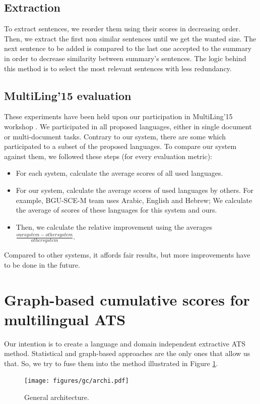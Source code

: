 \documentclass[12pt, oneside, a4paper]{article}
\begin{document}
\subsection{Extraction}

To extract sentences, we reorder them using their scores in decreasing order.
Then, we extract the first non similar sentences until we get the wanted size.
The next sentence to be added is compared to the last one accepted to the summary in order to decrease similarity between summary's sentences.
The logic behind this method is to select the most relevant sentences with less redundancy.

\subsection{MultiLing'15 evaluation}

These experiments have been held upon our participation in MultiLing'15 workshop \citep{15-aries-al}. 
We participated in all proposed languages, either in single document or multi-document tasks.
Contrary to our system, there are some which participated to a subset of the proposed languages. 
To compare our system against them, we followed these steps (for every evaluation metric): 
\begin{itemize}
	\item For each system, calculate the average scores of all used languages.
	\item For our system, calculate the average scores of used languages by others. 
	For example, BGU-SCE-M team uses Arabic, English and Hebrew; 
	We calculate the average of scores of these languages for this system and ours.
	\item Then, we calculate the relative improvement using the averages $ \frac{our system - other system}{other system} $.
\end{itemize}
Compared to other systems, it affords fair results, but more improvements have to be done in the future.




\section{Graph-based cumulative scores for multilingual ATS}

Our intention is to create a language and domain independent extractive ATS method.
Statistical and graph-based approaches are the only ones that allow us that. 
So, we try to fuse them into the method illustrated in Figure \ref{fig:archi}.
\begin{figure}[ht]
	\centering
	\texttt{[image: figures/gc/archi.pdf]} %
	\caption{General architecture.}
	\label{fig:archi}
\end{figure}
\end{document}
